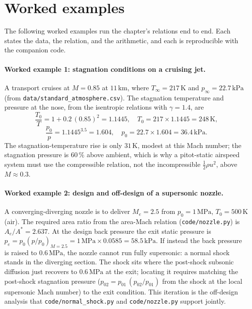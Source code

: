 \section{Worked examples}

The following worked examples run the chapter's relations end to end.
Each states the data, the relation, and the arithmetic, and each is
reproducible with the companion code.

\paragraph{Worked example 1: stagnation conditions on a cruising jet.}
A transport cruises at $M = 0.85$ at $11\,\si{\kilo\meter}$, where
$T_\infty = 217\,\si{\kelvin}$ and $p_\infty = 22.7\,\text{kPa}$
(from \texttt{data/standard\_atmosphere.csv}). The stagnation
temperature and pressure at the nose, from the isentropic relations
with $\gamma = 1.4$, are
\[
\frac{T_0}{T} = 1 + 0.2\,(0.85)^2 = 1.1445, \quad
T_0 = 217\times 1.1445 = 248\,\si{\kelvin},
\]
\[
\frac{p_0}{p} = 1.1445^{3.5} = 1.604, \quad
p_0 = 22.7\times 1.604 = 36.4\,\text{kPa}.
\]
The stagnation-temperature rise is only $31\,\si{\kelvin}$, modest at
this Mach number; the stagnation pressure is $60\,\%$ above ambient,
which is why a pitot-static airspeed system must use the compressible
relation, not the incompressible $\tfrac{1}{2}\rho u^2$, above
$M \approx 0.3$.

\paragraph{Worked example 2: design and off-design of a supersonic
nozzle.} A converging-diverging nozzle is to deliver $M_e = 2.5$ from
$p_0 = 1\,\text{MPa}$, $T_0 = 500\,\si{\kelvin}$ (air). The required
area ratio from the area-Mach relation (\texttt{code/nozzle.py}) is
$A_e/A^* = 2.637$. At the design back pressure the exit static
pressure is $p_e = p_0 (p/p_0)_{M=2.5} = 1\,\text{MPa}\times 0.0585 =
58.5\,\text{kPa}$. If instead the back pressure is raised to
$0.6\,\text{MPa}$, the nozzle cannot run fully supersonic: a normal
shock stands in the diverging section. The shock sits where the
post-shock subsonic diffusion just recovers to $0.6\,\text{MPa}$ at
the exit; locating it requires matching the post-shock stagnation
pressure ($p_{02} = p_{01}\,(p_{02}/p_{01})$ from the shock at the
local supersonic Mach number) to the exit condition. This iteration is
the off-design analysis that \texttt{code/normal\_shock.py} and
\texttt{code/nozzle.py} support jointly.

